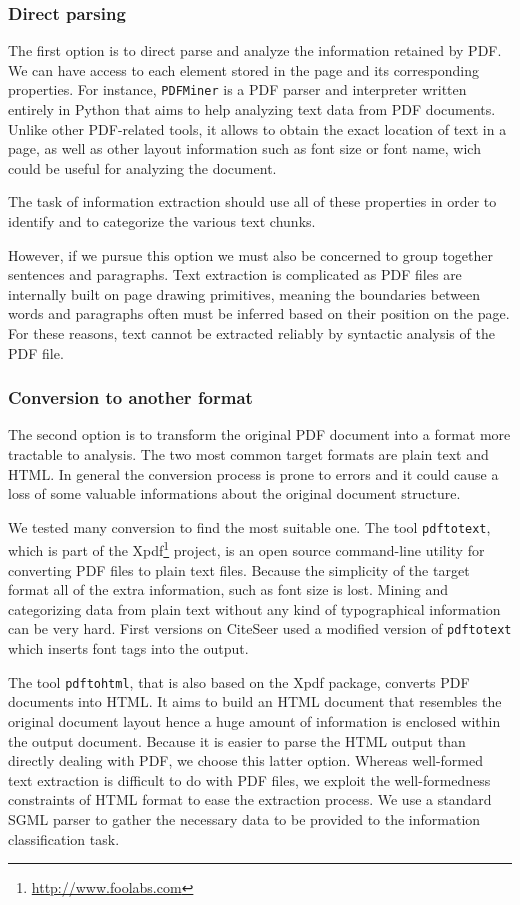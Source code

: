 \subsubsection{Direct parsing}
The first option is to direct parse and analyze the information retained by PDF. We can have access to each element stored in the page and its corresponding properties. For instance, \texttt{PDFMiner} is a PDF parser and interpreter written entirely in Python that aims to help analyzing text data from PDF documents. Unlike other PDF-related tools, it allows to obtain the exact location of text in a page, as well as other layout information such as font size or font name, wich could be useful for analyzing the document.

The task of information extraction should use all of these properties in order to identify and to categorize the various text chunks.

However, if we pursue this option we must also be concerned to group together sentences and paragraphs. Text extraction is complicated as PDF files are internally built on page drawing primitives, meaning the boundaries between words and paragraphs often must be inferred based on their position on the page. For these reasons, text cannot be extracted reliably by syntactic analysis of the PDF file.

\subsubsection{Conversion to another format}
The second option is to transform the original PDF document into a format more tractable to analysis. The two most common target formats are plain text and HTML. In general the conversion process is prone to errors and it could cause a loss of some valuable informations about the original document structure.

We tested many conversion to find the most suitable one. The tool \texttt{pdftotext}, which is part of the Xpdf\footnote{\url{http://www.foolabs.com}} project, is an open source command-line utility for converting PDF files to plain text files. Because the simplicity of the target format all of the extra information, such as font size is lost. Mining and categorizing data from plain text without any kind of typographical information can be very hard. First versions on CiteSeer \cite{giles1998cac} used a modified version of \texttt{pdftotext} which inserts font tags into the output.

The tool \texttt{pdftohtml}, that is also based on the Xpdf package, converts PDF documents into HTML. It aims to build an HTML document that resembles the original document layout hence a huge amount of information is enclosed within the output document. Because it is easier to parse the HTML output than directly dealing with PDF, we choose this latter option. Whereas well-formed text extraction is difficult to do with PDF files, we exploit the well-formedness constraints of HTML format to ease the extraction process. We use a standard SGML parser to gather the necessary data to be provided to the information classification task.

